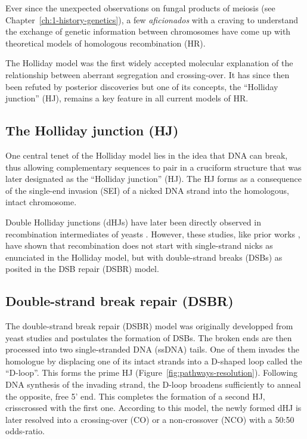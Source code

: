 Ever since the unexpected observations on fungal products of meiosis (see Chapter~\ref{ch:1-history-genetics}), a few \textit{aficionados} with a craving to understand the exchange of genetic information between chromosomes have come up with theoretical models of homologous recombination (HR).

The Holliday model \citep{holliday1964mechanism} was the first widely accepted molecular explanation of the relationship between aberrant segregation and crossing-over. 
It has since then been refuted by posterior discoveries but one of its concepts, the “Holliday junction” (HJ), remains a key feature in all current models of HR\@.


\subsection{The Holliday junction (HJ)}

One central tenet of the Holliday model lies in the idea that DNA can break, thus allowing complementary sequences to pair in a cruciform structure that was later designated as the “Holliday junction” (HJ).
The HJ forms as a consequence of the single-end invasion (SEI) of a nicked DNA strand into the homologous, intact chromosome.

Double Holliday junctions (dHJs) have later been directly observed in recombination intermediates of yeasts \citep{schwacha1994identification, schwacha1995identification}.
However, these studies, like prior works \citep{sun1989double,cao1990pathway}, have shown that recombination does not start with single-strand nicks as enunciated in the Holliday model, but with double-strand breaks (DSBs) as posited in the DSB repair (DSBR) model.


\subsection{Double-strand break repair (DSBR)}

The double-strand break repair (DSBR) model \citep{szostak1983doublestrandbreak} was originally developped from yeast studies \citep{orr-weaver1981yeast, orr-weaver1983yeast} and postulates the formation of DSBs. 
The broken ends are then processed into two single-stranded DNA (ssDNA) tails. 
One of them invades the homologue by displacing one of its intact strands into a D-shaped loop called the “D-loop”. This forms the prime HJ (Figure~\ref{fig:pathways-resolution}).
Following DNA synthesis of the invading strand, the D-loop broadens sufficiently to anneal the opposite, free 5’ end.
This completes the formation of a second HJ, crisscrossed with the first one.
According to this model, the newly formed dHJ is later resolved into a crossing-over (CO) or a non-crossover (NCO) with a 50:50 odds-ratio.

